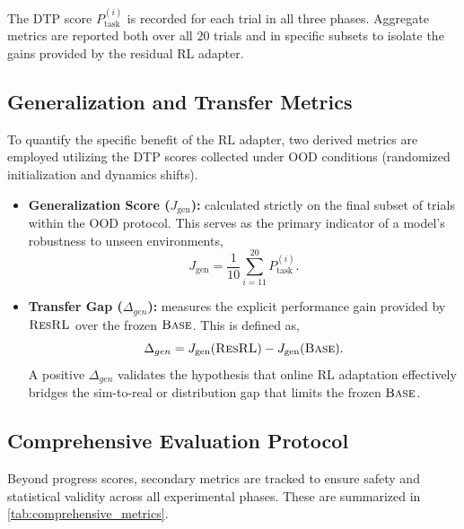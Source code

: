 The \ac{DTP} score $P_{\text{task}}^{(i)}$ is recorded for each trial in all three phases. Aggregate metrics are reported both over all $20$ trials and in specific subsets to isolate the gains provided by the residual RL adapter.

\subsection{Generalization and Transfer Metrics} 

To quantify the specific benefit of the RL adapter, two derived metrics are employed utilizing the DTP scores collected under \ac{OOD} conditions (randomized initialization and dynamics shifts).

\begin{itemize}
    \item \textbf{Generalization Score ($J_{\text{gen}}$):} calculated strictly on the final subset of trials within the \ac{OOD} protocol. This serves as the primary indicator of a model's robustness to unseen environments,
    \begin{equation}
        J_{\text{gen}} = \frac{1}{10} \sum_{i=11}^{20} P^{(i)}_{\text{task}}.
    \end{equation}
    \item \textbf{Transfer Gap ($\Delta_{gen}$):} measures the explicit performance gain provided by $\text{\textsc{ResRL}}$ over the frozen $\text{\textsc{Base}}$. This is defined as,
    \begin{equation}
        \Delta_{gen} = J_{\text{gen}}(\text{\textsc{ResRL}}) - J_{\text{gen}}(\text{\textsc{Base}}).
    \end{equation}
    A positive $\Delta_{gen}$ validates the hypothesis that online RL adaptation effectively bridges the sim-to-real or distribution gap that limits the frozen $\text{\textsc{Base}}$.
\end{itemize}

\subsection{Comprehensive Evaluation Protocol} 
Beyond progress scores, secondary metrics are tracked to ensure safety and statistical validity across all experimental phases. These are summarized in \cref{tab:comprehensive_metrics}.

